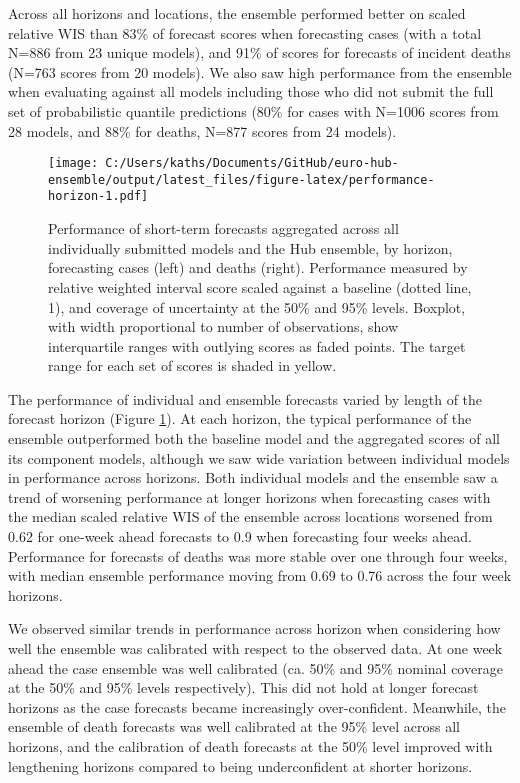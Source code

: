 \documentclass[
]{article}
\begin{document}
Across all horizons and locations, the ensemble performed better on scaled relative WIS than 83\% of forecast scores when forecasting cases (with a total N=886 from 23 unique models), and 91\% of scores for forecasts of incident deaths (N=763 scores from 20 models). We also saw high performance from the ensemble when evaluating against all models including those who did not submit the full set of probabilistic quantile predictions (80\% for cases with N=1006 scores from 28 models, and 88\% for deaths, N=877 scores from 24 models).

\begin{figure}
\centering
\texttt{[image: C:/Users/kaths/Documents/GitHub/euro-hub-ensemble/output/latest\_files/figure-latex/performance-horizon-1.pdf]}
\caption{\label{fig:performance-horizon}Performance of short-term forecasts aggregated across all individually submitted models and the Hub ensemble, by horizon, forecasting cases (left) and deaths (right). Performance measured by relative weighted interval score scaled against a baseline (dotted line, 1), and coverage of uncertainty at the 50\% and 95\% levels. Boxplot, with width proportional to number of observations, show interquartile ranges with outlying scores as faded points. The target range for each set of scores is shaded in yellow.}
\end{figure}

The performance of individual and ensemble forecasts varied by length of the forecast horizon (Figure \ref{fig:performance-horizon}). At each horizon, the typical performance of the ensemble outperformed both the baseline model and the aggregated scores of all its component models, although we saw wide variation between individual models in performance across horizons. Both individual models and the ensemble saw a trend of worsening performance at longer horizons when forecasting cases with the median scaled relative WIS of the ensemble across locations worsened from 0.62 for one-week ahead forecasts to 0.9 when forecasting four weeks ahead. Performance for forecasts of deaths was more stable over one through four weeks, with median ensemble performance moving from 0.69 to 0.76 across the four week horizons.

We observed similar trends in performance across horizon when considering how well the ensemble was calibrated with respect to the observed data. At one week ahead the case ensemble was well calibrated (ca. 50\% and 95\% nominal coverage at the 50\% and 95\% levels respectively). This did not hold at longer forecast horizons as the case forecasts became increasingly over-confident. Meanwhile, the ensemble of death forecasts was well calibrated at the 95\% level across all horizons, and the calibration of death forecasts at the 50\% level improved with lengthening horizons compared to being underconfident at shorter horizons.
\end{document}
